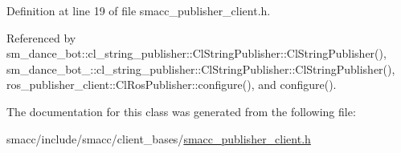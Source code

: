 Definition at line 19 of file smacc\+\_\+publisher\+\_\+client.\+h.



Referenced by sm\+\_\+dance\+\_\+bot\+::cl\+\_\+string\+\_\+publisher\+::\+Cl\+String\+Publisher\+::\+Cl\+String\+Publisher(), sm\+\_\+dance\+\_\+bot\+\_\+::cl\+\_\+string\+\_\+publisher\+::\+Cl\+String\+Publisher\+::\+Cl\+String\+Publisher(), ros\+\_\+publisher\+\_\+client\+::\+Cl\+Ros\+Publisher\+::configure(), and configure().



The documentation for this class was generated from the following file\+:\begin{DoxyCompactItemize}
\item 
smacc/include/smacc/client\+\_\+bases/\hyperlink{smacc__publisher__client_8h}{smacc\+\_\+publisher\+\_\+client.\+h}\end{DoxyCompactItemize}
